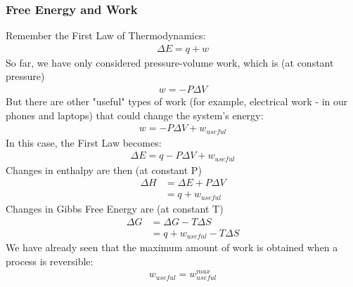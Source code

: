 \documentclass{article}  %
\begin{document}
\subsubsection*{Free Energy and Work}
Remember the First Law of Thermodynamics:
    \begin{equation*}
        \begin{aligned}
            \Delta E = q + w
        \end{aligned}
    \end{equation*}
So far, we have only considered pressure-volume work, which is (at constant pressure)
    \begin{equation*}
        \begin{aligned}
            w = -P\Delta V
        \end{aligned}
    \end{equation*}
But there are other "useful" types of work (for example, electrical work - in our phones and laptops) that could change the system's energy:
    \begin{equation*}
        \begin{aligned}
            w = -P\Delta V + w_{useful}
        \end{aligned}
    \end{equation*}
In this case, the First Law becomes:
    \begin{equation*}
        \begin{aligned}
            \Delta E = q- P\Delta V + w_{useful}
        \end{aligned}
    \end{equation*}
Changes in enthalpy are then (at constant P)
    \begin{equation*}
        \begin{aligned}
            \Delta H &= \Delta E + P\Delta V \\
            &= q + w_{useful}
        \end{aligned}
    \end{equation*}
Changes in Gibbs Free Energy are (at constant T)
    \begin{equation*}
        \begin{aligned}
            \Delta G &= \Delta G -T\Delta S \\
            &= q + w_{useful} - T\Delta S
        \end{aligned}
    \end{equation*}
We have already seen that the maximum amount of work is obtained when a process is reversible:
    \begin{equation*}
        \begin{aligned}
            w_{useful} = w^{max}_{useful}
        \end{aligned}
    \end{equation*}
\end{document}
